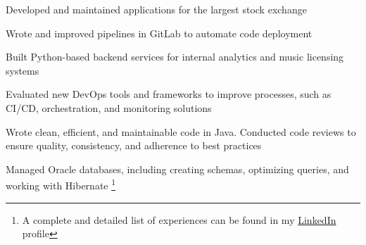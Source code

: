 \documentclass[]{willianpaixao-resume}
\begin{document}
\begin{minipage}[t]{0.64\textwidth}

\begin{tightemize}
\item Developed and maintained applications for the largest stock exchange
\item Wrote and improved pipelines in GitLab to automate code deployment
\end{tightemize}
\sectionsep

\begin{tightemize}
\item Built Python-based backend services for internal analytics and music licensing systems
\item Evaluated new DevOps tools and frameworks to improve processes, such as CI/CD, orchestration, and monitoring solutions
\end{tightemize}
\sectionsep

\sectionsep
\begin{tightemize}
\item Wrote clean, efficient, and maintainable code in Java. Conducted code reviews to ensure quality, consistency, and adherence to best practices
\item Managed Oracle databases, including creating schemas, optimizing queries, and working with Hibernate \footnote{A complete and detailed list of experiences can be found in my \href{https://www.linkedin.com/in/willianpaixao/details/experience/}{LinkedIn} profile}
\end{tightemize}
\end{minipage}
\end{document}
